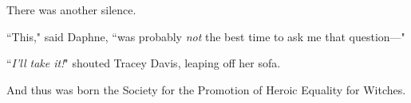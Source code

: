 There was another silence.

``This," said Daphne, ``was probably \emph{not} the best time to ask me that question—"

``\emph{I'll take it!}" shouted Tracey Davis, leaping off her sofa.

\later

And thus was born the Society for the Promotion of Heroic Equality for Witches.

